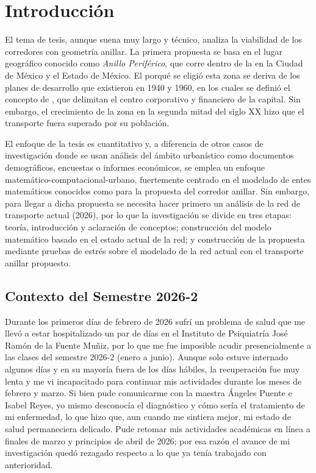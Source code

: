 
\section{Introducción}
\label{sec:introduccion}

El tema de tesis, aunque suena muy largo y técnico, analiza la viabilidad de los corredores
con geometría anillar. La primera propuesta se basa en el lugar geográfico conocido como
\textit{Anillo Periférico}, que corre dentro de la \zmvm en la Ciudad de México y el Estado
de México. El porqué se eligió esta zona se deriva de los planes de desarrollo que existieron
en 1940 y 1960, en los cuales se definió el concepto de , que
delimitan el centro corporativo y financiero de la capital. Sin embargo, el crecimiento de la
zona en la segunda mitad del siglo XX hizo que el transporte fuera superado por su población.

El enfoque de la tesis es cuantitativo y, a diferencia de otros casos de investigación donde
se usan análisis del ámbito urbanístico como documentos demográficos, encuestas o informes
económicos, se emplea un enfoque matemático-computacional-urbano, fuertemente centrado en el
modelado de entes matemáticos conocidos como  para la propuesta
del corredor anillar. Sin embargo, para llegar a dicha propuesta se necesita hacer primero un
análisis de la red de transporte actual (2026), por lo que la investigación se divide en tres
etapas: teoría, introducción y aclaración de conceptos; construcción del modelo matemático basado
en el estado actual de la red; y construcción de la propuesta mediante pruebas de estrés sobre el
modelado de la red actual con el transporte anillar propuesto.

\subsection{Contexto del Semestre 2026-2}
\label{ssec:contexto-semestre}

Durante los primeros días de febrero de 2026 sufrí un problema de salud que me llevó
a estar hospitalizado un par de días en el Instituto de Psiquiatría José Ramón de la Fuente Muñiz,
por lo que me fue imposible acudir presencialmente a las clases del semestre 2026-2
(enero a junio). Aunque solo estuve internado algunos días y en su mayoría fuera de los días
hábiles, la recuperación fue muy lenta y me vi incapacitado para continuar mis actividades durante
los meses de febrero y marzo. Si bien pude comunicarme con la maestra Ángeles Puente e Isabel Reyes,
yo mismo desconocía el diagnóstico y cómo sería el tratamiento de mi enfermedad, lo que hizo que,
aun cuando me sintiera mejor, mi estado de salud permaneciera delicado. Pude retomar mis actividades
académicas en línea a finales de marzo y principios de abril de 2026; por esa razón el avance de
mi investigación quedó rezagado respecto a lo que ya tenía trabajado con anterioridad.